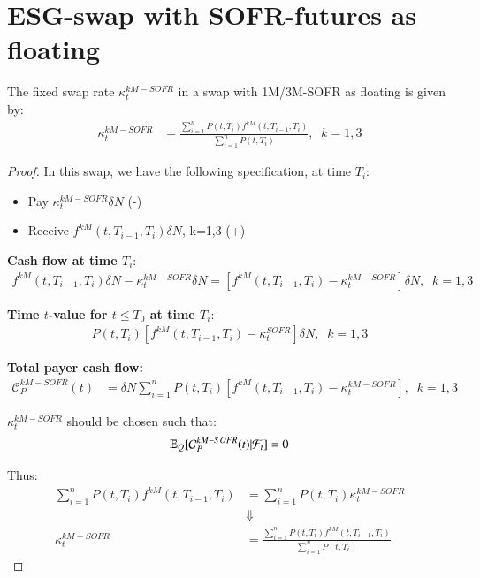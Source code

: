 \newpage 

\section{ESG-swap with SOFR-futures as floating}

\begin{proposition}
The fixed swap rate $\kappa_{t}^{kM-SOFR}$ in a swap with 1M/3M-SOFR as floating is given by:  
\begin{align*}
 \kappa_{t}^{kM-SOFR} &= 
 \frac{
 \sum_{i=1}^{n}P(t,T_{i})f^{kM}(t,T_{i-1}, T_{i})
 }{
 \sum_{i=1}^{n}P(t,T_{i})
 }, \;\; k = 1,3
\end{align*}
\end{proposition}

\begin{proof}
    
In this swap, we have the following specification, at time $T_{i}$:
\begin{itemize}[leftmargin=*]
    \item Pay $\kappa_{t}^{kM-SOFR}\delta N$ (-)
    \item Receive $f^{kM}(t,T_{i-1}, T_{i})\delta N$, \; k=1,3 (+)
\end{itemize} 

\textbf{Cash flow at time $T_{i}$}:
\begin{align*}
f^{kM}(t, T_{i-1}, T_{i})\delta N - \kappa_{t}^{kM-SOFR}\delta N =
[f^{kM}(t,T_{i-1}, T_{i}) -\kappa_{t}^{kM-SOFR}]\delta N, \;\; k=1,3
\end{align*}

\textbf{Time $t$-value for $t\leq T_{0}$ at time $T_{i}$}: 
\begin{align*}
P(t,T_{i})[f^{kM}(t,T_{i-1}, T_{i}) - \kappa_{t}^{SOFR}]\delta N,\;\; k=1,3
\end{align*}

\textbf{Total payer cash flow:}
\begin{align*}
\mathcal{C}_{P}^{kM-SOFR}(t) &= 
\delta N \sum_{i=1}^{n}P(t,T_{i})[f^{kM}(t,T_{i-1}, T_{i}) - \kappa_{t}^{kM-SOFR}], \;\; k=1,3
\end{align*} 

$\kappa_{t}^{kM-SOFR}$ should be chosen such that: 
\begin{align*}
\mathbb{E}_{Q}[\mathcal{C}_{P}^{kM-SOFR}(t)|\mathcal{F}_{t}] = 0    
\end{align*}

Thus: 
\begin{align*}
\sum_{i=1}^{n}P(t,T_{i})f^{kM}(t,T_{i-1}, T_{i}) &= \sum_{i=1}^{n}P(t,T_{i})\kappa_{t}^{kM-SOFR} \\ 
&\Downarrow \\ 
\kappa_{t}^{kM-SOFR} &= \frac{
\sum_{i=1}^{n}P(t,T_{i})f^{kM}(t,T_{i-1}, T_{i})
}{
\sum_{i=1}^{n}P(t,T_{i})
}
\end{align*}
\end{proof}
